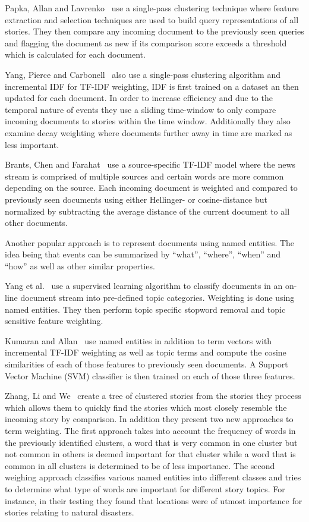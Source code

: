 Papka, Allan and Lavrenko~\cite{papka1998online} use a single-pass clustering technique where feature extraction and selection techniques are used to build query representations of all stories. They then compare any incoming document to the previously seen queries and flagging the document as new if its comparison score exceeds a threshold which is calculated for each document.

Yang, Pierce and Carbonell~\cite{yang1998study} also use a single-pass clustering algorithm and incremental IDF for TF-IDF weighting, IDF is first trained on a dataset an then updated for each document. In order to increase efficiency and due to the temporal nature of events they use a sliding time-window to only compare incoming documents to stories within the time window. Additionally they also examine decay weighting where documents further away in time are marked as less important.

Brants, Chen and Farahat~\cite{brants2003system} use a source-specific TF-IDF model where the news stream is comprised of multiple sources and certain words are more common depending on the source. Each incoming document is weighted and compared to previously seen documents using either Hellinger- or cosine-distance but normalized by subtracting the average distance of the current document to all other documents. %

Another popular approach is to represent documents using named entities. The idea being that events can be summarized  by ``what'', ``where'', ``when'' and ``how'' as well as other similar properties. %

Yang et al.~\cite{yang2002topic} use a supervised learning algorithm to classify documents in an on-line document stream into pre-defined topic categories. Weighting is done using named entities. They then perform topic specific stopword removal and topic sensitive feature weighting.

Kumaran and Allan~\cite{kumaran2005using} use named entities in addition to term vectors with incremental TF-IDF weighting as well as topic terms and compute the cosine similarities of each of those features to previously seen documents. A Support Vector Machine (SVM) classifier is then trained on each of those three features.

Zhang, Li and We~\cite{zhang2007new} create a tree of clustered stories from the stories they process which allows them to quickly find the stories which most closely resemble the incoming story by comparison. In addition they present two new approaches to term weighting. The first approach takes into account the frequency of words in the previously identified clusters, a word that is very common in one cluster but not common in others is deemed important for that cluster while a word that is common in all clusters is determined to be of less importance. The second weighing approach classifies various named entities into different classes and tries to determine what type of words are important for different story topics. For instance, in their testing they found that locations were of utmost importance for stories relating to natural disasters.

